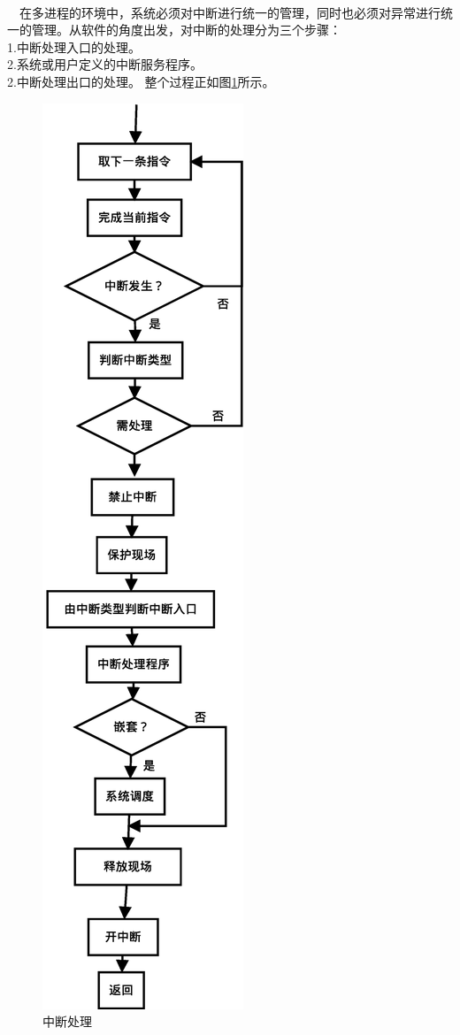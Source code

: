 \documentclass[UTF8,nofonts,cs4size]{ctexrep}
\begin{document}
\paragraph{}
\indent \ \ 在多进程的环境中，系统必须对中断进行统一的管理，同时也必须对异常进行统一的管理。从软件的角度出发，对中断的处理分为三个步骤：
\\ \indent 1.中断处理入口的处理。
\\ \indent 2.系统或用户定义的中断服务程序。
\\ \indent 2.中断处理出口的处理。
整个过程正如图\ref{interup}所示。

\begin{figure}[htp]
\centering
\includegraphics[scale=0.4]{interup.eps}
\caption{中断处理}
\label{interup}
\end{figure}
\end{document}
